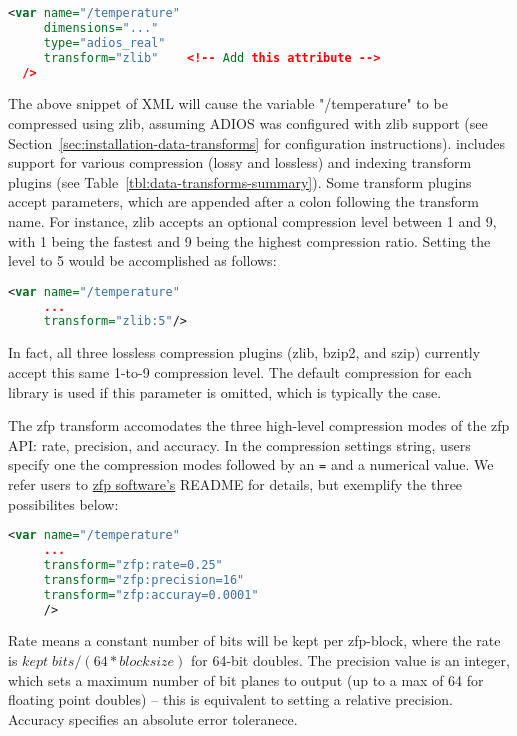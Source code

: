 \begin{lstlisting}[language=XML]
<var name="/temperature"
     dimensions="..."
     type="adios_real"
     transform="zlib"    <!-- Add this attribute -->
  />
\end{lstlisting}

The above snippet of XML will cause the variable "/temperature" to be compressed using zlib, assuming ADIOS was configured with zlib support
(see Section~\ref{sec:installation-data-transforms} for configuration instructions). \adiosversion includes support for 
various compression (lossy and lossless) and indexing transform plugins (see Table~\ref{tbl:data-transforms-summary}).
Some transform plugins accept parameters, which are appended after a colon following the transform name.
For instance, zlib accepts an optional compression level between 1 and 9, with 1 being the fastest and
9 being the highest compression ratio. Setting the level to 5 would be accomplished as follows:

\begin{lstlisting}[language=XML]
<var name="/temperature"
     ...
     transform="zlib:5"/>
\end{lstlisting}

In fact, all three lossless compression plugins (zlib, bzip2, and szip) currently accept this same
1-to-9 compression level. The default compression for each library is used if this parameter is
omitted, which is typically the case.

The zfp transform accomodates the three high-level compression modes of the zfp API: rate, precision, and accuracy.
In the compression settings string, users specify one the compression modes followed by an \texttt{=} and a numerical value.
We refer users to \href{http://computation.llnl.gov/projects/floating-point-compression}{zfp software's} README for details,
but exemplify the three possibilites below:
\begin{lstlisting}[language=XML]
<var name="/temperature"
     ...
     transform="zfp:rate=0.25"
     transform="zfp:precision=16"
     transform="zfp:accuray=0.0001"
     />
\end{lstlisting}
Rate means a constant number of bits will be kept per zfp-block, where the rate is $ kept \; bits/ (64*blocksize)$ for 64-bit doubles.
The precision value is an integer, which sets a maximum number of bit planes to output (up to a max of 64 for floating point doubles) -- 
this is equivalent to setting a relative precision.
Accuracy specifies an absolute error toleranece.



